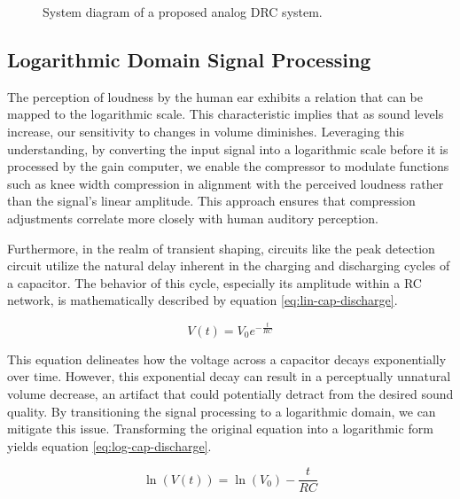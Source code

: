 \documentclass[10pt]{article}
\begin{document}
\begin{multicols*}{2}
\begin{figure}[!th]
                        \caption{System diagram of a proposed analog DRC system.}
                        \label{fig:drc-diagram}

                    \end{figure}
    
            \subsection{Logarithmic Domain Signal Processing}
                The perception of loudness by the human ear exhibits a relation that can be mapped to the logarithmic scale. This characteristic implies that as sound levels increase, our sensitivity to changes in volume diminishes. Leveraging this understanding, by converting the input signal into a logarithmic scale before it is processed by the gain computer, we enable the compressor to modulate functions such as knee width compression in alignment with the perceived loudness rather than the signal's linear amplitude. This approach ensures that compression adjustments correlate more closely with human auditory perception.\par
                Furthermore, in the realm of transient shaping, circuits like the peak detection circuit utilize the natural delay inherent in the charging and discharging cycles of a capacitor. The behavior of this cycle, especially its amplitude within a RC network, is mathematically described by equation \ref{eq:lin-cap-discharge}.
                
                    \begin{equation}\label{eq:lin-cap-discharge}
                        V(t) = V_0 e^{-\frac{t}{RC}}
                    \end{equation}    
                
                \noindent This equation delineates how the voltage across a capacitor decays exponentially over time. However, this exponential decay can result in a perceptually unnatural volume decrease, an artifact that could potentially detract from the desired sound quality. By transitioning the signal processing to a logarithmic domain, we can mitigate this issue. Transforming the original equation into a logarithmic form yields equation \ref{eq:log-cap-discharge}.
                
                    \begin{equation}\label{eq:log-cap-discharge}
                        \ln(V(t)) = \ln(V_0) - \frac{t}{RC}
                    \end{equation}
                

\end{multicols*}
\end{document}
